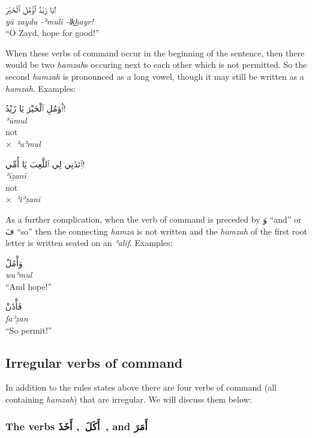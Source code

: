 \documentclass[
  10pt,
]{book}
\begin{document}
\foreignlanguage{arabic}{يَا زَيْدُ ٱؤْمُلِ ٱلْخَيْرَ!}\\
\emph{yā zaydu -ʾmuli -lk͟hayr!}\\
\enquote{O Zayd, hope for good!}

When these verbs of command occur in the beginning of the sentence, then there would be two \emph{hamzah}s occuring next to each other which is not permitted. So the second \emph{hamzah} is pronounced as a long vowel, though it may still be written as a \emph{hamzah}. Examples:

\foreignlanguage{arabic}{ٱُؤمُلِ ٱلْخَيْرَ يَا زَيْدُ!}\\
\emph{ʾūmul}\\
not\\
\(\times\)~\emph{ʾuʾmul}

\foreignlanguage{arabic}{ٱِئذَنِي لِي ٱللَّعِبَ يَا أُمِّي!}\\
\emph{ʾīẕanī}\\
not\\
\(\times\)~\emph{ʾiʾẕanī}

As a further complication, when the verb of command is preceded by
\foreignlanguage{arabic}{وَ} \enquote{and}
or
\foreignlanguage{arabic}{فَ} \enquote{so}
then the connecting \emph{hamza} is not written
and the \emph{hamzah} of the first root letter is written seated on an \emph{ʾalif}.
Examples:

\foreignlanguage{arabic}{وَأْمُلْ}\\
\emph{waʾmul}\\
\enquote{And hope!}

\foreignlanguage{arabic}{فَأْذَنْ}\\
\emph{faʾẕan}\\
\enquote{So permit!}

\subsection{Irregular verbs of command}\label{irregular-verbs-of-command}

In addition to the rules states above there are four verbs of command (all containing \emph{hamzah}) that are irregular. We will discuss them below:

\subsubsection{\texorpdfstring{The verbs \foreignlanguage{arabic}{أَکَلَ}~, \foreignlanguage{arabic}{أَخَذَ}~, and \foreignlanguage{arabic}{أَمَرَ}}{The verbs أَکَلَ~, أَخَذَ~, and أَمَرَ}}\label{the-verbs-ux623ux643ux644-ux623ux62eux630-and-ux623ux645ux631}
\end{document}
